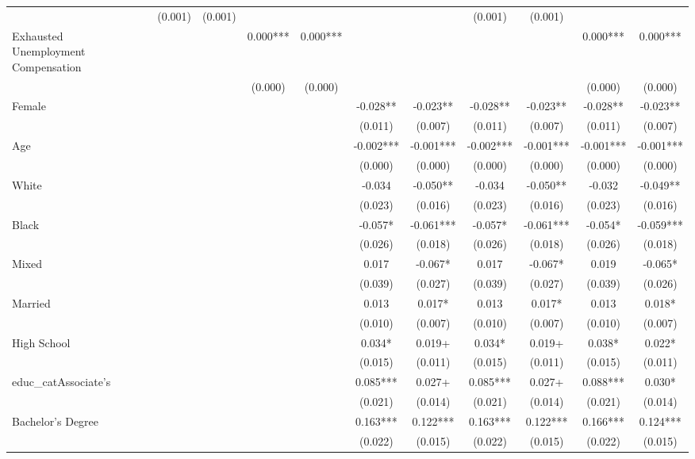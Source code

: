\documentclass[
]{article}
\begin{document}
\begin{table}[t]
\begin{tabular*}{\linewidth}{@{\extracolsep{\fill}}lcccccccccccc}
 &  &  & (0.001) & (0.001) &  &  &  &  & (0.001) & (0.001) &  &  \\ 
Exhausted Unemployment Compensation &  &  &  &  & 0.000*** & 0.000*** &  &  &  &  & 0.000*** & 0.000*** \\ 
 &  &  &  &  & (0.000) & (0.000) &  &  &  &  & (0.000) & (0.000) \\ 
Female &  &  &  &  &  &  & -0.028** & -0.023** & -0.028** & -0.023** & -0.028** & -0.023** \\ 
 &  &  &  &  &  &  & (0.011) & (0.007) & (0.011) & (0.007) & (0.011) & (0.007) \\ 
Age &  &  &  &  &  &  & -0.002*** & -0.001*** & -0.002*** & -0.001*** & -0.001*** & -0.001*** \\ 
 &  &  &  &  &  &  & (0.000) & (0.000) & (0.000) & (0.000) & (0.000) & (0.000) \\ 
White &  &  &  &  &  &  & -0.034 & -0.050** & -0.034 & -0.050** & -0.032 & -0.049** \\ 
 &  &  &  &  &  &  & (0.023) & (0.016) & (0.023) & (0.016) & (0.023) & (0.016) \\ 
Black &  &  &  &  &  &  & -0.057* & -0.061*** & -0.057* & -0.061*** & -0.054* & -0.059*** \\ 
 &  &  &  &  &  &  & (0.026) & (0.018) & (0.026) & (0.018) & (0.026) & (0.018) \\ 
Mixed &  &  &  &  &  &  & 0.017 & -0.067* & 0.017 & -0.067* & 0.019 & -0.065* \\ 
 &  &  &  &  &  &  & (0.039) & (0.027) & (0.039) & (0.027) & (0.039) & (0.026) \\ 
Married &  &  &  &  &  &  & 0.013 & 0.017* & 0.013 & 0.017* & 0.013 & 0.018* \\ 
 &  &  &  &  &  &  & (0.010) & (0.007) & (0.010) & (0.007) & (0.010) & (0.007) \\ 
High School &  &  &  &  &  &  & 0.034* & 0.019+ & 0.034* & 0.019+ & 0.038* & 0.022* \\ 
 &  &  &  &  &  &  & (0.015) & (0.011) & (0.015) & (0.011) & (0.015) & (0.011) \\ 
educ\_catAssociate's &  &  &  &  &  &  & 0.085*** & 0.027+ & 0.085*** & 0.027+ & 0.088*** & 0.030* \\ 
 &  &  &  &  &  &  & (0.021) & (0.014) & (0.021) & (0.014) & (0.021) & (0.014) \\ 
Bachelor's Degree &  &  &  &  &  &  & 0.163*** & 0.122*** & 0.163*** & 0.122*** & 0.166*** & 0.124*** \\ 
 &  &  &  &  &  &  & (0.022) & (0.015) & (0.022) & (0.015) & (0.022) & (0.015) \\ 

\end{tabular*}
\end{table}
\end{document}
